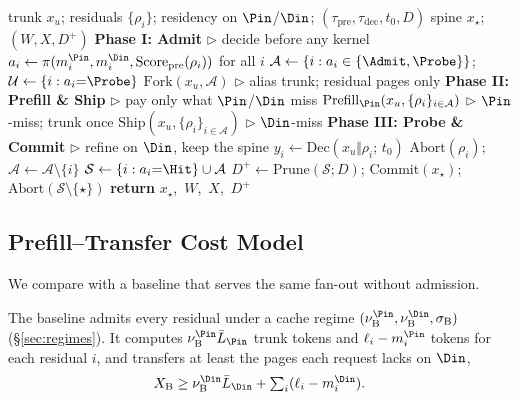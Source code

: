 \begin{algorithm}[t]
\caption{\sys{} (one fan-out).
Actions follow \eqref{eq:action}; costs follow \eqref{eq:work}--\eqref{eq:dec}.}
\label{alg:app}
\small
\begin{algorithmic}[1]
\REQUIRE trunk $x_u$; residuals $\{\rho_i\}$; residency on $\Pin$/$\Din$; $(\tau_{\mathrm{pre}},\tau_{\mathrm{dec}},t_0,D)$
\ENSURE spine $x_\star$; $(W,X,D^{+})$
\STATE
\STATE \textbf{Phase I: Admit} \hfill \(\triangleright\) decide before any kernel
\STATE $a_i\leftarrow\pi(m_i^{\Pin},m_i^{\Din},\mathrm{Score}_{\mathrm{pre}}(\rho_i))$ for all $i$
\STATE $\mathcal{A}\leftarrow\{i:a_i\in\{\Admit,\Probe\}\}$;\;
  $\mathcal{U}\leftarrow\{i:a_i{=}\Probe\}$
\STATE $\mathrm{Fork}(x_u,\mathcal{A})$ \hfill \(\triangleright\) alias trunk; residual pages only
\STATE
\STATE \textbf{Phase II: Prefill \& Ship} \hfill \(\triangleright\) pay only what $\Pin$/$\Din$ miss
\STATE $\mathrm{Prefill}_{\Pin}(x_u,\{\rho_i\}_{i\in\mathcal{A}})$ \hfill \(\triangleright\) $\Pin$-miss; trunk once
\STATE $\mathrm{Ship}(x_u,\{\rho_i\}_{i\in\mathcal{A}})$ \hfill \(\triangleright\) $\Din$-miss
\STATE
\STATE \textbf{Phase III: Probe \& Commit} \hfill \(\triangleright\) refine on $\Din$, keep the spine
  \STATE $y_i\leftarrow\mathrm{Dec}(x_u\Vert\rho_i;\,t_0)$
    \STATE $\mathrm{Abort}(\rho_i)$;\; $\mathcal{A}\leftarrow\mathcal{A}\setminus\{i\}$
  \ENDIF
\ENDFOR
\STATE $\mathcal{S}\leftarrow\{i:a_i{=}\Hit\}\cup\mathcal{A}$
\STATE $D^{+}\leftarrow\mathrm{Prune}(\mathcal{S};D)$;\;
  $\mathrm{Commit}(x_\star)$;\;
  $\mathrm{Abort}(\mathcal{S}\setminus\{\star\})$
\STATE \textbf{return} $x_\star$,\ $W$,\ $X$,\ $D^{+}$
\end{algorithmic}
\end{algorithm}

\subsection{Prefill--Transfer Cost Model}
\label{sec:accounting}

We compare \sys with a baseline that serves the same fan-out without admission.

\begin{assumption}[Baseline]
\label{ass:baseline}
The baseline admits every residual under a cache regime $(\nu_{\mathrm{B}}^{\Pin},\nu_{\mathrm{B}}^{\Din},\sigma_{\mathrm{B}})$ (\S\ref{sec:regimes}).
It computes $\nu_{\mathrm{B}}^{\Pin}\bar L_{\Pin}$ trunk tokens and $\ell_i-m_i^{\Pin}$ tokens for each residual $i$, and transfers at least the pages each request lacks on $\Din$,
\begin{equation}
\label{eq:xbase}
X_{\mathrm{B}}\ge \nu_{\mathrm{B}}^{\Din}\bar L_{\Din}+\textstyle\sum_i(\ell_i-m_i^{\Din}).
\end{equation}
\end{assumption}

